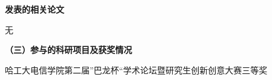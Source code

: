 \begin{publication}
\noindent\textbf{发表的相关论文}
\begin{publist}
\item	无

\end{publist}

\noindent\textbf{（三）参与的科研项目及获奖情况}
\begin{publist}
\item	哈工大电信学院第二届”巴龙杯“学术论坛暨研究生创新创意大赛三等奖

\end{publist}
\end{publication}
